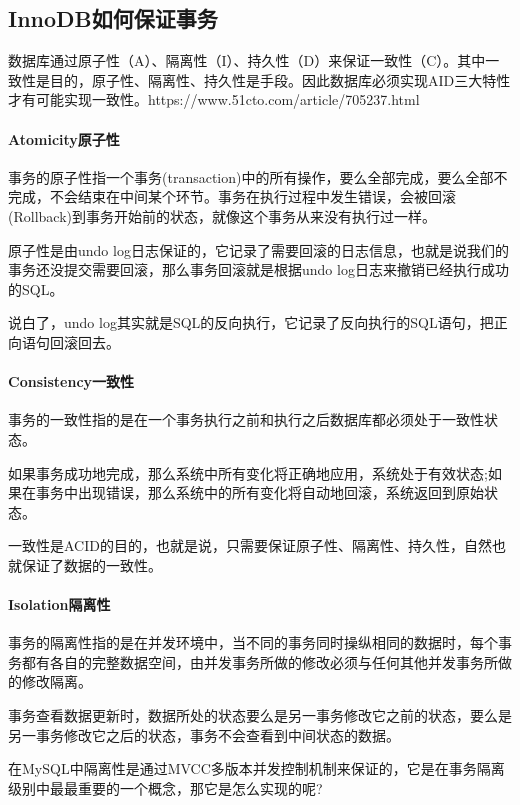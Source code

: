 \documentclass[../../../interview-questions.tex]{subfiles}
\begin{document}
\subsection{InnoDB如何保证事务}

数据库通过原子性（A）、隔离性（I）、持久性（D）来保证一致性（C）。其中一致性是目的，原子性、隔离性、持久性是手段。因此数据库必须实现AID三大特性才有可能实现一致性。https://www.51cto.com/article/705237.html

\paragraph{Atomicity原子性}

事务的原子性指一个事务(transaction)中的所有操作，要么全部完成，要么全部不完成，不会结束在中间某个环节。事务在执行过程中发生错误，会被回滚(Rollback)到事务开始前的状态，就像这个事务从来没有执行过一样。

原子性是由undo log日志保证的，它记录了需要回滚的日志信息，也就是说我们的事务还没提交需要回滚，那么事务回滚就是根据undo log日志来撤销已经执行成功的SQL。

说白了，undo log其实就是SQL的反向执行，它记录了反向执行的SQL语句，把正向语句回滚回去。

\paragraph{Consistency一致性}

事务的一致性指的是在一个事务执行之前和执行之后数据库都必须处于一致性状态。

如果事务成功地完成，那么系统中所有变化将正确地应用，系统处于有效状态;如果在事务中出现错误，那么系统中的所有变化将自动地回滚，系统返回到原始状态。

一致性是ACID的目的，也就是说，只需要保证原子性、隔离性、持久性，自然也就保证了数据的一致性。

\paragraph{Isolation隔离性}

事务的隔离性指的是在并发环境中，当不同的事务同时操纵相同的数据时，每个事务都有各自的完整数据空间，由并发事务所做的修改必须与任何其他并发事务所做的修改隔离。

事务查看数据更新时，数据所处的状态要么是另一事务修改它之前的状态，要么是另一事务修改它之后的状态，事务不会查看到中间状态的数据。

在MySQL中隔离性是通过MVCC多版本并发控制机制来保证的，它是在事务隔离级别中最最重要的一个概念，那它是怎么实现的呢?
\end{document}
